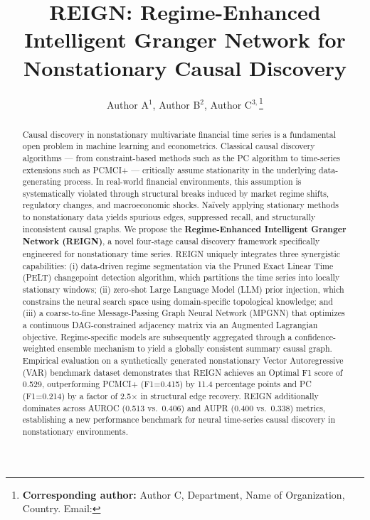 \documentclass{BVP_JDSIS}
\begin{document}

\title{REIGN: Regime-Enhanced Intelligent Granger Network for Nonstationary Causal Discovery}

\author{Author A$^{1}$, Author B$^{2}$, Author C$^{3,}$\thanks{\textbf{Corresponding author:} Author C, Department, Name of Organization, Country. Email: }}


\begin{abstract}
Causal discovery in nonstationary multivariate financial time series is a fundamental open problem in machine learning and econometrics. Classical causal discovery algorithms — from constraint-based methods such as the PC algorithm to time-series extensions such as PCMCI+ — critically assume stationarity in the underlying data-generating process. In real-world financial environments, this assumption is systematically violated through structural breaks induced by market regime shifts, regulatory changes, and macroeconomic shocks. Naïvely applying stationary methods to nonstationary data yields spurious edges, suppressed recall, and structurally inconsistent causal graphs. We propose the \textbf{Regime-Enhanced Intelligent Granger Network (REIGN)}, a novel four-stage causal discovery framework specifically engineered for nonstationary time series. REIGN uniquely integrates three synergistic capabilities: (i) data-driven regime segmentation via the Pruned Exact Linear Time (PELT) changepoint detection algorithm, which partitions the time series into locally stationary windows; (ii) zero-shot Large Language Model (LLM) prior injection, which constrains the neural search space using domain-specific topological knowledge; and (iii) a coarse-to-fine Message-Passing Graph Neural Network (MPGNN) that optimizes a continuous DAG-constrained adjacency matrix via an Augmented Lagrangian objective. Regime-specific models are subsequently aggregated through a confidence-weighted ensemble mechanism to yield a globally consistent summary causal graph. Empirical evaluation on a synthetically generated nonstationary Vector Autoregressive (VAR) benchmark dataset demonstrates that REIGN achieves an Optimal F1 score of 0.529, outperforming PCMCI+ (F1=0.415) by 11.4 percentage points and PC (F1=0.214) by a factor of 2.5$\times$ in structural edge recovery. REIGN additionally dominates across AUROC (0.513 vs.\ 0.406) and AUPR (0.400 vs.\ 0.338) metrics, establishing a new performance benchmark for neural time-series causal discovery in nonstationary environments.
\end{abstract}
\end{document}
